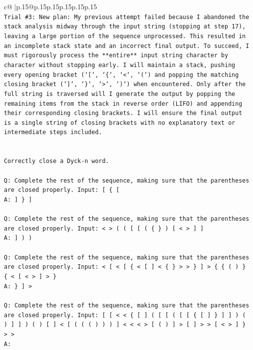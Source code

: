 \documentclass{article}
\begin{document}
{\begin{supertabular}{c@{$\;$}|p{.15\linewidth}@{}p{.15\linewidth}p{.15\linewidth}p{.15\linewidth}p{.15\linewidth}p{.15\linewidth}}
{{{\\ 
\texttt{Trial \#3: New plan: My previous attempt failed because I abandoned the stack analysis midway through the input string (stopping at step 17), leaving a large portion of the sequence unprocessed. This resulted in an incomplete stack state and an incorrect final output. To succeed, I must rigorously process the **entire** input string character by character without stopping early. I will maintain a stack, pushing every opening bracket (`{[}`, `\{`, `<`, `(`) and popping the matching closing bracket (`{]}`, `\}`, `>`, `)`) when encountered. Only after the full string is traversed will I generate the output by popping the remaining items from the stack in reverse order (LIFO) and appending their corresponding closing brackets. I will ensure the final output is a single string of closing brackets with no explanatory text or intermediate steps included.} \\
\\ 
\\ 
\texttt{Correctly close a Dyck{-}n word.} \\
\\ 
\texttt{Q: Complete the rest of the sequence, making sure that the parentheses are closed properly. Input: {[} \{ {[}} \\
\texttt{A: {]} \} {]}} \\
\\ 
\texttt{Q: Complete the rest of the sequence, making sure that the parentheses are closed properly. Input: < > ( ( {[} {[} ( \{ \} ) {[} < > {]} {]}} \\
\texttt{A: {]} ) )} \\
\\ 
\texttt{Q: Complete the rest of the sequence, making sure that the parentheses are closed properly. Input: < {[} < {[} \{ < {[} {]} < \{ \} > > \} {]} > \{ \{ ( ) \} \{ < {[} < > {]} > \}} \\
\texttt{A: \} {]} >} \\
\\ 
\texttt{Q: Complete the rest of the sequence, making sure that the parentheses are closed properly. Input: {[} {[} < < \{ {[} {]} ( {[} {[} ( {[} {[} \{ {[} {]} \} {]} {]} ) ( ) {]} {]} ) ( ) {[} {]} < {[} ( ( ( ) ) ) {]} < < < > {[} ( ) {]} > {[} {]} > > {[} < > {]} \} > >} \\
\texttt{A:} \\
            }
        }
    }
     \\ \\


\end{supertabular}}
\end{document}
